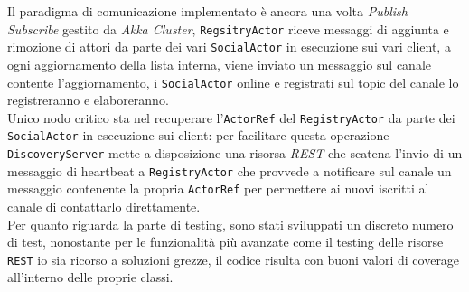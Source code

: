 Il paradigma di comunicazione implementato è ancora una volta \textit{Publish Subscribe} gestito da \textit{Akka Cluster}, \texttt{RegsitryActor} riceve messaggi di aggiunta e rimozione di attori da parte dei vari \texttt{SocialActor} in esecuzione sui vari client, a ogni aggiornamento della lista interna, viene inviato un messaggio sul canale contente l'aggiornamento, i \texttt{SocialActor} online e registrati sul topic del canale lo registreranno e elaboreranno.\\
Unico nodo critico sta nel recuperare l'\texttt{ActorRef} del \texttt{RegistryActor} da parte dei \texttt{SocialActor} in esecuzione sui client: per facilitare questa operazione \texttt{DiscoveryServer} mette a disposizione una risorsa \textit{REST} che scatena l'invio di un messaggio di heartbeat a \texttt{RegistryActor} che provvede a notificare sul canale un messaggio contenente la propria \texttt{ActorRef} per permettere ai nuovi iscritti al canale di contattarlo direttamente.\\
Per quanto riguarda la parte di testing, sono stati sviluppati un discreto numero di test, nonostante per le funzionalità più avanzate come il testing delle risorse \texttt{REST} io sia ricorso a soluzioni grezze, il codice risulta con buoni valori di coverage all'interno delle proprie classi.

